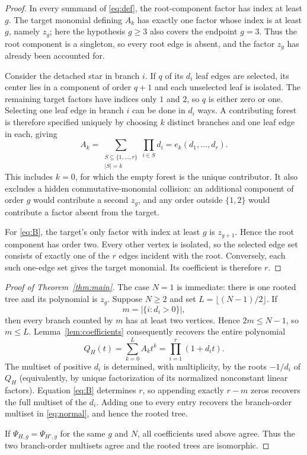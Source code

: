 \documentclass[11pt]{article}
\begin{document}
\begin{proof}
In every summand of \eqref{eq:def}, the root-component factor has index
at least $g$.  The target monomial defining $A_k$ has exactly one factor
whose index is at least $g$, namely $z_g$; here the hypothesis $g\geq3$
also covers the endpoint $g=3$.  Thus the root component is a singleton,
so every root edge is absent, and the factor $z_g$ has already been
accounted for.

Consider the detached star in branch $i$.  If $q$ of its $d_i$ leaf
edges are selected, its center lies in a component of order $q+1$ and
each unselected leaf is isolated.  The remaining target factors have
indices only $1$ and $2$, so $q$ is either zero or one.  Selecting one
leaf edge in branch $i$ can be done in $d_i$ ways.  A contributing forest
is therefore specified uniquely by choosing $k$ distinct branches and
one leaf edge in each, giving
\[
 A_k=\sum_{\substack{S\subseteq\{1,\ldots,r\}\\|S|=k}}
      \prod_{i\in S}d_i=e_k(d_1,\ldots,d_r).
\]
This includes $k=0$, for which the empty forest is the unique
contributor.  It also excludes a hidden commutative-monomial collision:
an additional component of order $g$ would contribute a second $z_g$,
and any order outside $\{1,2\}$ would contribute a factor absent from the
target.

For \eqref{eq:B}, the target's only factor with index at least $g$ is
$z_{g+1}$.  Hence the root component has order two.  Every other vertex
is isolated, so the selected edge set consists of exactly one of the $r$
edges incident with the root.  Conversely, each such one-edge set gives
the target monomial.  Its coefficient is therefore $r$.
\end{proof}

\begin{proof}[Proof of Theorem~\ref{thm:main}]
The case $N=1$ is immediate: there is one rooted tree and its polynomial
is $z_g$.  Suppose $N\geq2$ and set
$L=\lfloor(N-1)/2\rfloor$.  If
\[
 m=|\{i:d_i>0\}|,
\]
then every branch counted by $m$ has at least two vertices.  Hence
$2m\leq N-1$, so $m\leq L$.  Lemma~\ref{lem:coefficients} consequently
recovers the entire polynomial
\begin{equation}\label{eq:Q}
 Q_H(t)=\sum_{k=0}^{L}A_kt^k
       =\prod_{i=1}^{r}(1+d_it).
\end{equation}
The multiset of positive $d_i$ is determined, with multiplicity, by the
roots $-1/d_i$ of $Q_H$ (equivalently, by unique factorization of its
normalized nonconstant linear factors).  Equation \eqref{eq:B} determines
$r$, so appending exactly $r-m$ zeros recovers the full multiset of the
$d_i$.  Adding one to every entry recovers the branch-order multiset in
\eqref{eq:normal}, and hence the rooted tree.

If $\Psi_{H,g}=\Psi_{H',g}$ for the same $g$ and $N$, all coefficients
used above agree.  Thus the two branch-order multisets agree and the
rooted trees are isomorphic.
\end{proof}
\end{document}
